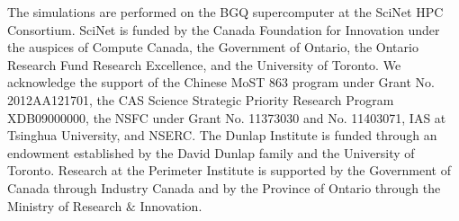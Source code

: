 \documentclass[aps,prl,twocolumn,showpacs,superscriptaddress,groupedaddress,nofootinbib]{revtex4}  %
\begin{document}
The simulations are performed on the BGQ supercomputer at the SciNet HPC 
Consortium. SciNet is funded by the Canada Foundation for Innovation under 
the auspices of Compute Canada, the Government of Ontario, the Ontario Research 
Fund Research Excellence, and the University of Toronto.
We acknowledge the support of the Chinese MoST 863 program under Grant 
No. 2012AA121701, the CAS Science Strategic Priority Research Program 
XDB09000000, the NSFC under Grant No. 11373030 and No. 11403071, IAS at Tsinghua University, 
 and NSERC.
The Dunlap Institute is funded through an endowment established by the David Dunlap family and the University of Toronto.
Research at the Perimeter Institute is supported by the Government of Canada
through Industry Canada and by the Province of Ontario through the Ministry of
Research $\&$ Innovation.



\end{document}
